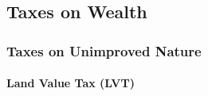 
\subsection{Taxes on Wealth} %

\subsubsection{Taxes on Unimproved Nature}


\paragraph{Land Value Tax (LVT)}
	\label{sec:LVT}




